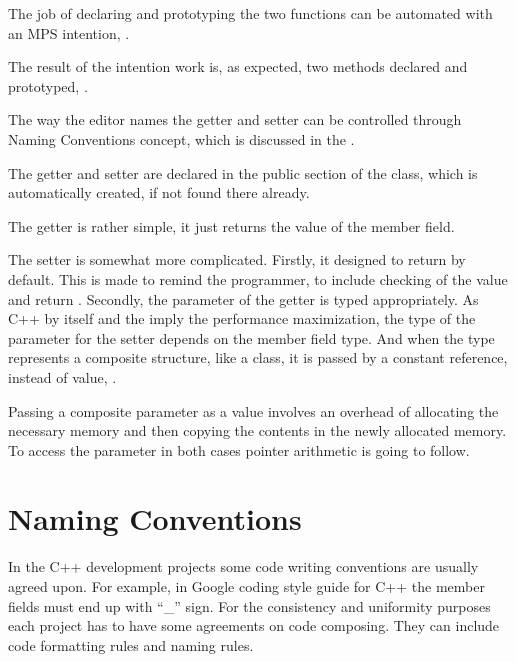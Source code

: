 The job of declaring and prototyping the two functions can be automated with an MPS intention, .


The result of the intention work is, as expected, two methods declared and prototyped, .


The way the editor names the getter and setter can be controlled through Naming Conventions concept, which
is discussed in the .

The getter and setter are declared in the public section of the class, which is automatically created, if
not found there already.

The getter is rather simple, it just returns the value of the member field.

The setter is somewhat more complicated. Firstly, it designed to return  by default. This is made
to remind the programmer, to include checking of the value and return . Secondly, the parameter of the
getter is typed appropriately. As C++ by itself and the  imply the performance maximization, the type
of the parameter for the setter depends on the member field type. And when the type represents a composite
structure, like a class, it is passed by a constant reference, instead of value, .


Passing a composite parameter as a value involves an overhead of allocating the necessary memory and 
then copying the contents in the newly allocated memory. To access the parameter in both cases pointer
arithmetic is going to follow.



\section{Naming Conventions}
\label{section:namingconventions}

In the C++ development projects some code writing conventions are usually agreed upon. For example, 
in Google coding style guide for C++ \cite{googlecppstyle} the member fields must end up with ``\_'' sign.
For the consistency and uniformity purposes each project has to have some agreements on code  composing.
They can include code formatting rules and naming rules. 

